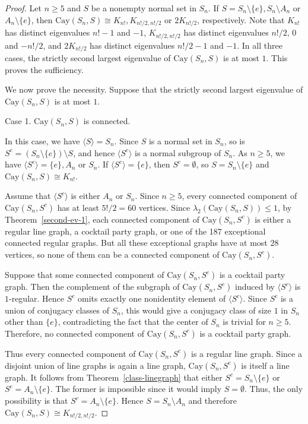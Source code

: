 \documentclass[12pt, a4paper]{article}
\theoremstyle{definition}
\begin{document}
\begin{proof}
Let $n\ge 5$ and $S$ be a nonempty normal set in $S_n$. If $S=S_n\setminus\{e\}, S_n\setminus A_n$ or $A_n\setminus\{e\}$, then $\mathrm{Cay}(S_n,S)\cong K_{n!}, K_{n!/2,n!/2}$ or $2K_{n!/2}$, respectively. Note that $K_{n!}$ has distinct eigenvalues $n!-1$ and $-1$, $K_{n!/2,n!/2}$ has distinct eigenvalues  $n!/2$, $0$ and $-n!/2$, and $2K_{n!/2}$ has distinct eigenvalues $n!/2-1$ and $-1$. In all three cases, the strictly second largest eigenvalue of $\mathrm{Cay}(S_n,S)$ is at most $1$. This proves the sufficiency. 

We now prove the necessity. Suppose that the strictly second largest eigenvalue of $\mathrm{Cay}(S_n,S)$ is at most $1$. 

\smallskip
\textsf{Case 1.} $\mathrm{Cay}(S_n,S)$ is connected.
\smallskip

In this case, we have $\langle S \rangle = S_n$. Since $S$ is a normal set in $S_n$, so is $S^c=(S_n\setminus\{e\})\setminus S$, and hence $\langle S^c\rangle$ is a normal subgroup of $S_n$. As $n \ge 5$, we have $\langle S^c\rangle = \{e\},A_n$ or $S_n$.
If $\langle S^c\rangle=\{e\}$, then $S^c=\emptyset$, so $S=S_n\setminus\{e\}$ and  $\mathrm{Cay}(S_n,S)\cong K_{n!}$.

Assume that $\langle S^c\rangle$ is either $A_n$ or $S_n$. Since $n\ge 5$, every connected component of $\mathrm{Cay}(S_n,S^c)$ has at least $5!/2=60$ vertices. Since $\lambda_2(\mathrm{Cay}(S_n,S))\le 1$, by Theorem~\ref{second-ev-1}, each connected component of $\mathrm{Cay}(S_n,S^c)$ is either a regular line graph, a cocktail party graph, or one of the 187 exceptional connected regular graphs. But all these exceptional graphs have at most $28$ vertices, so none of them can be a connected component of $\mathrm{Cay}(S_n,S^c)$.

Suppose that some connected component of $\mathrm{Cay}(S_n,S^c)$ is a cocktail party graph. Then the complement of the subgraph of $\mathrm{Cay}(S_n,S^c)$ induced by $\langle S^c\rangle$ is $1$-regular. Hence $S^c$ omits exactly one nonidentity element of $\langle S^c\rangle$. Since $S^c$ is a union of conjugacy classes of $S_n$, this would give a conjugacy class of size $1$ in $S_n$ other than $\{e\}$, contradicting the fact that the center of $S_n$ is trivial for $n\ge 5$. Therefore, no connected component of $\mathrm{Cay}(S_n,S^c)$ is a cocktail party graph.

Thus every connected component of $\mathrm{Cay}(S_n,S^c)$ is a regular line graph. Since a disjoint union of line graphs is again a line graph, $\mathrm{Cay}(S_n,S^c)$ is itself a line graph. It follows from Theorem~\ref{class-linegraph} that either $S^c=S_n\setminus\{e\}$ or $S^c=A_n\setminus\{e\}$. The former is impossible since it would imply $S=\emptyset$. Thus, the only possibility is that $S^c=A_n\setminus\{e\}$. Hence $S=S_n\setminus A_n$ and therefore $\mathrm{Cay}(S_n,S)\cong K_{n!/2,n!/2}$.


\end{proof}
\end{document}

